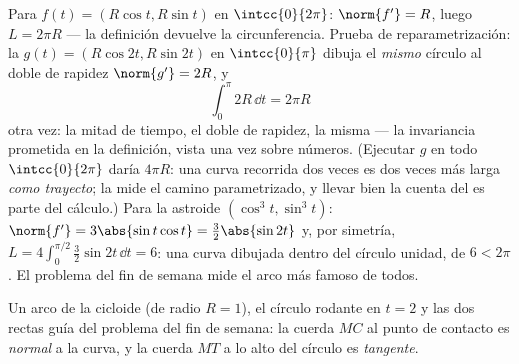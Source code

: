 \begin{example}\label{ex:b1:curves:circlelength}
Para $f(t) = (R\cos t, R\sin t)$ en $\intcc{0}{2\pi}$:
$\norm{f'} = R$, luego $L = 2\pi R$ --- la definición devuelve la
circunferencia. Prueba de reparametrización: la 
$g(t) = (R\cos 2t, R\sin 2t)$ en $\intcc{0}{\pi}$ dibuja el
\emph{mismo} círculo al doble de rapidez $\norm{g'} = 2R$, y
\[
\int_0^{\pi} 2R\,\dd t = 2\pi R
\]
otra vez: la mitad de tiempo, el doble de rapidez, la misma
 --- la invariancia prometida en la definición, vista una
vez sobre números. (Ejecutar $g$ en todo $\intcc{0}{2\pi}$ daría
$4\pi R$: una curva recorrida dos veces es dos veces más larga
\emph{como trayecto}; la  mide el camino parametrizado, y
llevar bien la cuenta del  es parte del cálculo.) Para la
astroide $(\cos^3t, \sin^3t)$:
$\norm{f'} = 3\abs{\sin t\cos t} = \tfrac32\abs{\sin 2t}$ y, por
simetría, $L = 4\int_0^{\pi/2} \tfrac32\sin 2t\,\dd t = 6$: una curva
dibujada dentro del círculo unidad, de  $6 < 2\pi$. El
problema del fin de semana mide el arco más famoso de todos.
\end{example}

\begin{omfigure}

{\small Un arco de la cicloide (de radio $R = 1$), el círculo rodante
en $t = 2$ y las dos rectas guía del problema del fin de semana: la
cuerda $MC$ al punto de contacto es \emph{normal} a la curva, y la
cuerda $MT$ a lo alto del círculo es \emph{tangente}.}
\end{omfigure}

